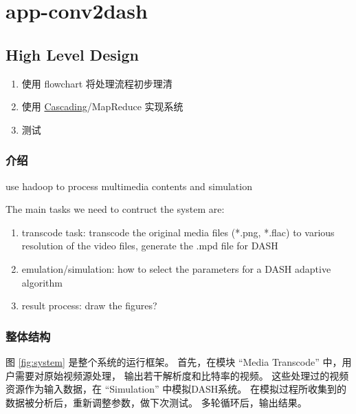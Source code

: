 %

\chapter{app-conv2dash}


\section{High Level Design}



\begin{enumerate}
  \item 使用 flowchart 将处理流程初步理清
  \item 使用 \href{http://www.cascading.org/}{Cascading}/MapReduce 实现系统
  \item 测试
\end{enumerate}


\subsection{介绍}

use hadoop to process multimedia contents and simulation

The main tasks we need to contruct the system are:

\begin{enumerate}
  \item transcode task:
  transcode the original media files (*.png, *.flac) to various resolution of the video files,
  generate the .mpd file for DASH

  \item emulation/simulation:
  how to select the parameters for a DASH adaptive algorithm

  \item result process:
  draw the figures?

\end{enumerate}


\subsection{整体结构}
图 \ref{fig:system} 是整个系统的运行框架。
首先，在模块 ``Media Transcode'' 中，用户需要对原始视频源处理，
输出若干解析度和比特率的视频。
这些处理过的视频资源作为输入数据，在 ``Simulation'' 中模拟DASH系统。
在模拟过程所收集到的数据被分析后，重新调整参数，做下次测试。
多轮循环后，输出结果。

